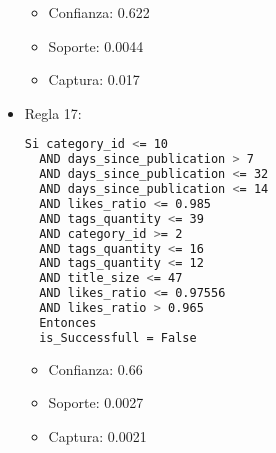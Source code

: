 \begin{itemize}
    \begin{itemize}
      \item Confianza: 0.622
      \item Soporte: 0.0044
      \item Captura: 0.017
    \end{itemize}

  \item Regla 17:

\begin{lstlisting}[language=bash, numbers=none]
  Si category_id <= 10
  AND days_since_publication > 7
  AND days_since_publication <= 32
  AND days_since_publication <= 14
  AND likes_ratio <= 0.985
  AND tags_quantity <= 39
  AND category_id >= 2
  AND tags_quantity <= 16
  AND tags_quantity <= 12
  AND title_size <= 47
  AND likes_ratio <= 0.97556
  AND likes_ratio > 0.965
  Entonces
  is_Successfull = False
\end{lstlisting}

    \begin{itemize}
      \item Confianza: 0.66
      \item Soporte: 0.0027
      \item Captura: 0.0021
    \end{itemize}

\end{itemize}
